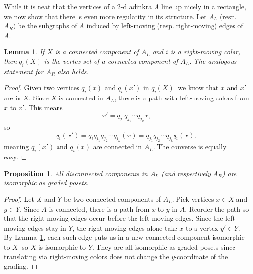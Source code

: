 \documentclass[12pt,twoside,singlespace]{article}
\numberwithin{equation}{section}
\newtheorem{lem}[equation]{Lemma}
\newtheorem{prop}[equation]{Proposition}
\theoremstyle{definition}
\begin{document}
While it is neat that the vertices of a $2$-d adinkra $A$ line up nicely in a rectangle, we now show that there is even more regularity in its structure. Let $A_L$ (resp. $A_R)$ be the subgraphs of $A$ induced by left-moving (resp. right-moving) edges of $A$. %

\begin{lem}
\label{lem:kevin-translate-component}
If $X$ is a connected component of $A_L$ and $i$ is a right-moving color, then $q_i(X)$ is the vertex set of a connected component of $A_L$. The analogous statement for $A_R$ also holds.
\end{lem}
\begin{proof}
Given two vertices $q_i(x)$ and $q_i(x')$ in $q_i(X)$, we know that $x$ and $x'$ are in $X$. Since $X$ is connected in $A_L$, there is a path with left-moving colors from $x$ to $x'$. This means 
\[
x' = q_{j_1}q_{j_2}\cdots q_{j_k} x,
\]
so
\[
q_i (x') = q_i q_{j_1} q_{j_2} \cdots q_{j_k} (x) = q_{j_1} q_{j_2} \cdots q_{j_k} q_i (x),
\]
meaning $q_i(x')$ and $q_i(x)$ are connected in $A_L$. The converse is equally easy.
\end{proof}

\begin{prop}
\label{prop:kevin}
All disconnected components in $A_L$ (and respectively $A_R$) are isomorphic as graded posets.
\end{prop}
\begin{proof}
Let $X$ and $Y$ be two connected components of $A_L$. Pick vertices $x \in X$ and $y \in Y$. Since $A$ is connected, there is a path from $x$ to $y$ in $A$. Reorder the path so that the right-moving edges occur before the left-moving edges. Since the left-moving edges stay in $Y$, the right-moving edges alone take $x$ to a vertex $y' \in Y$. By Lemma~\ref{lem:kevin-translate-component}, each such edge puts us in a new connected component isomorphic to $X$, so $X$ is isomorphic to $Y$. They are all isomorphic as graded posets since translating via right-moving colors does not change the $y$-coordinate of the grading.
\end{proof}

\end{document}
